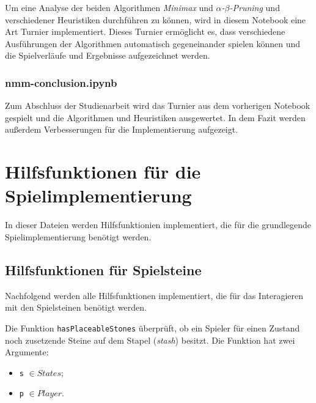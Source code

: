 \documentclass[11pt]{article}
\providecommand{\tightlist}{%
      \setlength{\itemsep}{0pt}\setlength{\parskip}{0pt}}
\begin{document}
Um eine Analyse der beiden Algorithmen \emph{Minimax} und
\emph{$\alpha$-$\beta$-Pruning} und verschiedener Heuristiken durchführen zu können,
wird in diesem Notebook eine Art Turnier implementiert. Dieses Turnier
ermöglicht es, dass verschiedene Ausführungen der Algorithmen
automatisch gegeneinander spielen können und die Spielverläufe und
Ergebnisse aufgezeichnet werden.

\hypertarget{nmm-conclusion.ipynb}{%
\subsubsection{nmm-conclusion.ipynb}\label{nmm-conclusion.ipynb}}

Zum Abschluss der Studienarbeit wird das Turnier aus dem vorherigen
Notebook gespielt und die Algorithmen und Heuristiken ausgewertet. In
dem Fazit werden außerdem Verbesserungen für die Implementierung
aufgezeigt.


    
 
    
    
    


    \hypertarget{hilfsfunktionen-fuxfcr-die-spielimplementierung}{%
\section{Hilfsfunktionen für die
Spielimplementierung}\label{hilfsfunktionen-fuxfcr-die-spielimplementierung}}

In dieser Dateien werden Hilfsfunktionien implementiert, die für die
grundlegende Spielimplementierung benötigt werden.

    \hypertarget{hilfsfunktionen-fuxfcr-spielsteine}{%
\subsection{Hilfsfunktionen für
Spielsteine}\label{hilfsfunktionen-fuxfcr-spielsteine}}

Nachfolgend werden alle Hilfsfunktionen implementiert, die für das
Interagieren mit den Spielsteinen benötigt werden.

    Die Funktion \texttt{hasPlaceableStones} überprüft, ob ein Spieler für
einen Zustand noch zusetzende Steine auf dem Stapel (\emph{stash})
besitzt. Die Funktion hat zwei Argumente:

\begin{itemize}
\tightlist
\item
  \texttt{s} \(\in States\);
\item
  \texttt{p} \(\in Player\).
\end{itemize}
\end{document}
